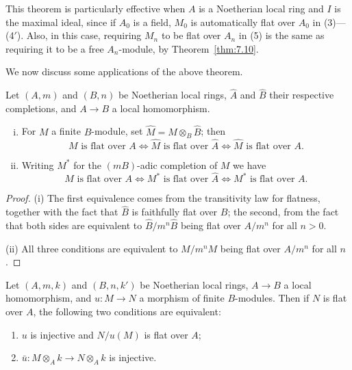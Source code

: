 This theorem is particularly effective when $A$ is a Noetherian local ring and
$I$ is the maximal ideal, since if $A_0$ is a field, $M_0$ is automatically flat
over $A_0$ in (3)---(4$'$). Also, in this case, requiring $M_n$ to be flat over $A_n$ in
(5) is the same as requiring it to be a free $A_n$-module, by
Theorem~\ref{thm:7.10}.

We now discuss some applications of the above theorem.

\begin{theorem}\label{thm:22.4}
Let $(A, m)$ and $(B, n)$ be Noetherian local rings, $\hat{A}$ and $\hat{B}$
their respective completions, and $A \to B$ a local homomorphism.
\begin{enumerate}[(i)]
  \item For $M$ a finite $B$-module, set $\hat{M} = M \otimes_B \hat{B}$; then
        \[
          M \text{ is flat over } A \iff \hat{M} \text{ is flat over } \hat{A} \iff \hat{M} \text{ is flat over } A.
        \]
  \item Writing $M^*$ for the $(mB)$-adic completion of $M$ we have
        \[
          M \text{ is flat over } A \iff M^* \text{ is flat over } \hat{A} \iff M^* \text{ is flat over } A.
        \]
\end{enumerate}
\end{theorem}

\begin{proof}
(i) The first equivalence comes from the transitivity law for flatness, together
with the fact that $\hat{B}$ is faithfully flat over $B$; the second, from the fact that
both sides are equivalent to $\hat{B}/m^n\hat{B}$ being flat over $A/m^n$ for all $n > 0$.

(ii) All three conditions are equivalent to $M/m^nM$ being flat over $A/m^n$ for
all $n$.
\end{proof}

\begin{theorem}\label{thm:22.5}
Let $(A, m, k)$ and $(B, n, k')$ be Noetherian local rings, $A \to B$ a local
homomorphism, and $u\colon M \to N$ a morphism of finite $B$-modules. Then if
$N$ is flat over $A$, the following two conditions are equivalent:
\begin{enumerate}[(1)]
  \item $u$ is injective and $N/u(M)$ is flat over $A$;
  \item $\bar{u}\colon M \otimes_A k \to N \otimes_A k$ is injective.
\end{enumerate}
\end{theorem}

